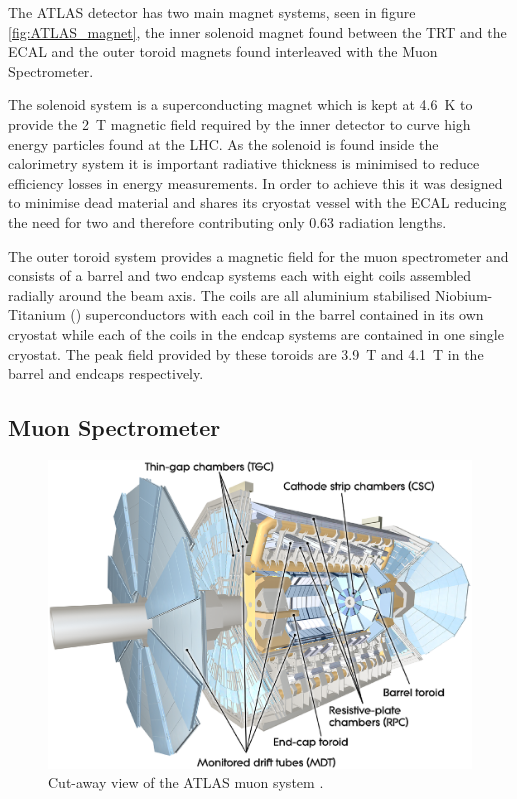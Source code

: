 		The ATLAS detector has two main magnet systems, seen in figure \ref{fig:ATLAS_magnet}, the inner solenoid magnet found between the TRT and the ECAL and the outer toroid magnets found interleaved with the Muon Spectrometer. 

		The solenoid system is a superconducting magnet which is kept at \SI{4.6}{\K} to provide the \SI{2}{T} magnetic field required by the inner detector to curve high energy particles found at the LHC. As the solenoid is found inside the calorimetry system it is important radiative thickness is minimised to reduce efficiency losses in energy measurements. In order to achieve this it was designed to minimise dead material and shares its cryostat vessel with the ECAL reducing the need for two and therefore contributing only 0.63 radiation lengths.

		The outer toroid system provides a magnetic field for the muon spectrometer and consists of a barrel and two endcap systems each with eight coils assembled radially around the beam axis. The coils are all aluminium stabilised Niobium-Titanium () superconductors with each coil in the barrel contained in its own cryostat while each of the coils in the endcap systems are contained in one single cryostat. The peak field provided by these toroids are \SI{3.9}{T} and \SI{4.1}{T} in the barrel and endcaps respectively.\\

	


	\subsection{Muon Spectrometer}

		\begin{figure}[h]
			\begin{center}
				\includegraphics[scale=0.4]{images/MuonSystem_d3.eps}
			\end{center}
			\caption{ Cut-away view of the ATLAS muon system \cite{Aad:1129811}.}
			\label{fig:ATLAS_muon}
		\end{figure}

